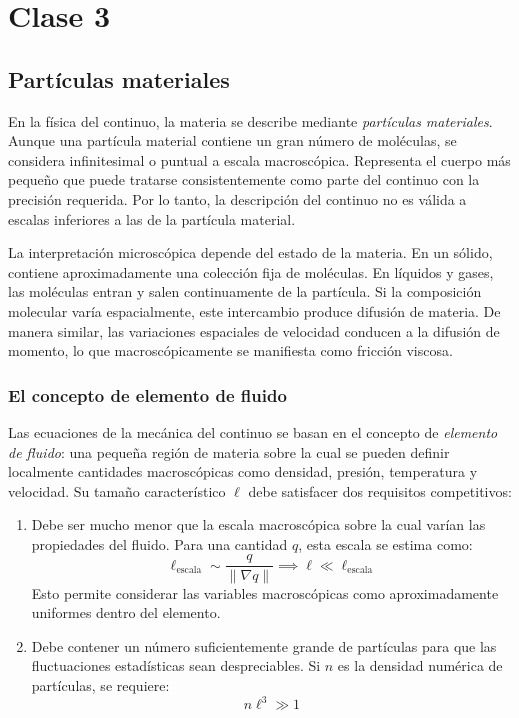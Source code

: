 \shorthandoff{<>}



\shorthandon{<>}

\chapter{Clase 3}
\section{Partículas materiales}
En la física del continuo, la materia se describe mediante \textit{partículas materiales}. Aunque una partícula material contiene un gran número de moléculas, se considera infinitesimal o puntual a escala macroscópica. Representa el cuerpo más pequeño que puede tratarse consistentemente como parte del continuo con la precisión requerida. Por lo tanto, la descripción del continuo no es válida a escalas inferiores a las de la partícula material.

La interpretación microscópica depende del estado de la materia. En un sólido, contiene aproximadamente una colección fija de moléculas. En líquidos y gases, las moléculas entran y salen continuamente de la partícula. Si la composición molecular varía espacialmente, este intercambio produce difusión de materia. De manera similar, las variaciones espaciales de velocidad conducen a la difusión de momento, lo que macroscópicamente se manifiesta como fricción viscosa.

\subsection{El concepto de elemento de fluido}
Las ecuaciones de la mecánica del continuo se basan en el concepto de \textit{elemento de fluido}: una pequeña región de materia sobre la cual se pueden definir localmente cantidades macroscópicas como densidad, presión, temperatura y velocidad. Su tamaño característico $\ell$ debe satisfacer dos requisitos competitivos:

\begin{enumerate}
    \item Debe ser mucho menor que la escala macroscópica sobre la cual varían las propiedades del fluido. Para una cantidad $q$, esta escala se estima como:
    $$ \ell_{\text{escala}} \sim \frac{q}{\|\nabla q\|} \implies \ell \ll \ell_{\text{escala}} $$
    Esto permite considerar las variables macroscópicas como aproximadamente uniformes dentro del elemento.
    
    \item Debe contener un número suficientemente grande de partículas para que las fluctuaciones estadísticas sean despreciables. Si $n$ es la densidad numérica de partículas, se requiere:
    $$ n\ell^3 \gg 1 $$
\end{enumerate}

